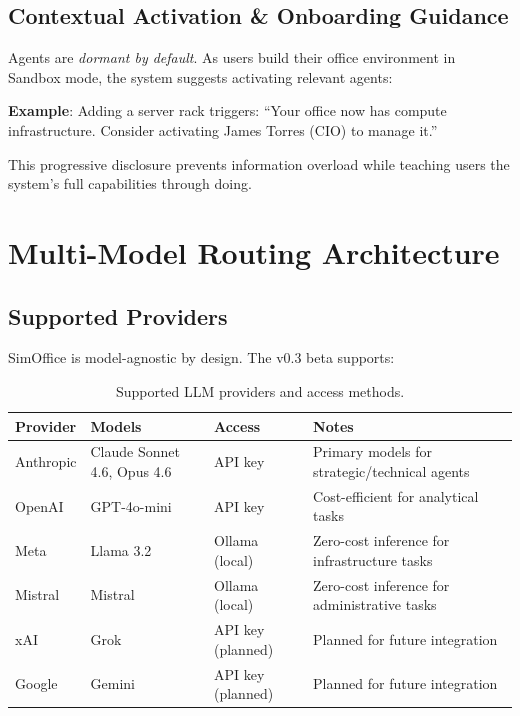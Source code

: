 \documentclass[11pt,letterpaper]{article}
\begin{document}
\subsection{Contextual Activation \& Onboarding Guidance}

Agents are \emph{dormant by default}. As users build their office environment in Sandbox mode, the system suggests activating relevant agents:

\begin{notebox}
\textbf{Example}: Adding a server rack triggers: ``Your office now has compute infrastructure. Consider activating James Torres (CIO) to manage it.''
\end{notebox}

This progressive disclosure prevents information overload while teaching users the system's full capabilities through doing.


\section{Multi-Model Routing Architecture}

\subsection{Supported Providers}

SimOffice is model-agnostic by design. The v0.3 beta supports:

\begin{table}[H]
\centering
\small
\begin{tabularx}{\textwidth}{lllX}
\toprule
\textbf{Provider} & \textbf{Models} & \textbf{Access} & \textbf{Notes} \\
\midrule
Anthropic & Claude Sonnet 4.6, Opus 4.6 & API key          & Primary models for strategic/technical agents \\
OpenAI    & GPT-4o-mini                  & API key          & Cost-efficient for analytical tasks \\
Meta      & Llama 3.2                    & Ollama (local)   & Zero-cost inference for infrastructure tasks \\
Mistral   & Mistral                      & Ollama (local)   & Zero-cost inference for administrative tasks \\
xAI       & Grok                         & API key (planned) & Planned for future integration \\
Google    & Gemini                       & API key (planned) & Planned for future integration \\
\bottomrule
\end{tabularx}
\caption{Supported LLM providers and access methods.}
\end{table}
\end{document}
